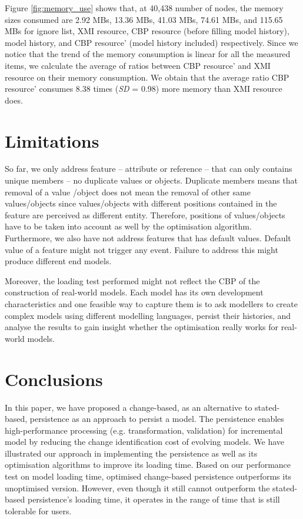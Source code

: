 \documentclass{llncs}
\begin{document}
Figure \ref{fig:memory_use} shows that, at 40,438 number of nodes, the memory sizes consumed are 2.92 MBs, 13.36 MBs, 41.03 MBs, 74.61 MBs, and 115.65 MBs for ignore list, XMI resource, CBP resource (before filling model history), model history, and CBP resource' (model history included) respectively. Since we notice that the trend of the memory consumption is linear for all the measured items, we calculate the average of ratios between CBP resource' and XMI resource on their memory consumption. We obtain that the average ratio CBP resource' consumes 8.38 times (\emph{SD} = 0.98) more memory than XMI resource does.

\section{Limitations}
\label{sec:limitations}
So far, we only address feature -- attribute or reference -- that can only contains unique members -- no duplicate values or objects. Duplicate members means that removal of a value /object does not mean the removal of other same values/objects since values/objects with different positions contained in the feature are perceived as different entity. Therefore, positions of values/objects have to be taken into account as well by the optimisation algorithm. Furthermore, we also have not address features that has default values. Default value of a feature might not trigger any event. Failure to address this might produce different end models. 

Moreover, the loading test performed might not reflect the CBP of the construction of real-world models. Each model has its own development characteristics and one feasible way to capture them is to ask modellers to create complex models using different modelling languages, persist their histories, and analyse the results to gain insight whether the optimisation really works for real-world models. 

\section{Conclusions}
\label{sec:conclusions}
In this paper, we have proposed a change-based, as an alternative to stated-based, persistence as an approach to persist a model. The persistence enables high-performance processing (e.g. transformation, validation) for incremental model by reducing the change identification cost of evolving models. We have illustrated our approach in implementing the persistence as well as its optimisation algorithms to improve its loading time. Based on our performance test on model loading time, optimised change-based persistence outperforms its unoptimised version. However, even though it still cannot outperform the stated-based persistence's loading time, it operates in the range of time that is still tolerable for users. 
\end{document}
